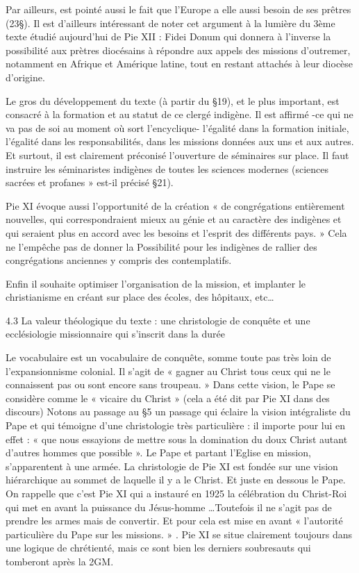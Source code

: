 Par ailleurs, est pointé aussi le fait que l’Europe a elle aussi besoin de ses prêtres (23§). Il est d’ailleurs intéressant de noter cet argument à la lumière du 3ème texte étudié aujourd’hui de Pie XII : Fidei Donum qui donnera à l’inverse la possibilité aux prètres diocésains à répondre aux appels des missions d'outremer, notamment en Afrique et Amérique latine, tout en restant attachés à leur diocèse d'origine.

Le gros du développement du texte (à partir du §19), et le plus important, est consacré à la formation et au statut de ce clergé indigène. Il est affirmé -ce qui ne va pas de soi au moment où sort l’encyclique-  l’égalité dans la formation initiale, l’égalité dans les responsabilités, dans les missions données aux uns et aux autres. Et surtout, il est clairement préconisé l’ouverture de séminaires sur place. Il faut instruire les séminaristes indigènes de toutes les sciences modernes (sciences sacrées et profanes » est-il précisé §21). 

Pie XI évoque aussi l’opportunité de la création « de congrégations entièrement nouvelles, qui correspondraient mieux au génie et au caractère des indigènes et qui seraient plus en accord avec les besoins et l’esprit des différents pays. » Cela ne l’empêche pas de donner la Possibilité pour les indigènes de rallier des congrégations anciennes y compris des contemplatifs. 

Enfin il souhaite optimiser l’organisation de la mission, et implanter le christianisme en créant sur place des écoles, des hôpitaux, etc… 
 
4.3	La valeur théologique du texte : une christologie de conquête et une ecclésiologie missionnaire qui s’inscrit dans la durée

Le vocabulaire est un vocabulaire de conquête, somme toute pas très loin de l’expansionnisme colonial. Il s’agit de « gagner au Christ tous ceux qui ne le connaissent pas ou sont encore sans troupeau. »  Dans cette vision, le Pape se considère comme le « vicaire du Christ » (cela a été dit par Pie XI dans des discours)
Notons au passage au §5 un passage qui éclaire la vision intégraliste du Pape et qui témoigne d’une christologie très particulière : il importe pour lui en effet : « que nous essayions de mettre sous la domination du doux Christ autant d’autres hommes que possible ». Le Pape et partant l’Eglise en mission, s’apparentent à une armée. La christologie de Pie XI est fondée sur une vision hiérarchique au sommet de laquelle il y a le Christ. Et juste en dessous le Pape.  On rappelle que c’est Pie XI qui a instauré en 1925 la célébration du Christ-Roi qui met en avant la puissance du Jésus-homme …Toutefois il ne s’agit pas de prendre les armes mais de convertir. Et pour cela est mise en avant « l’autorité particulière du Pape sur les missions. » . Pie XI se situe clairement toujours dans une logique de chrétienté, mais ce sont bien les derniers soubresauts qui tomberont après la 2GM.

